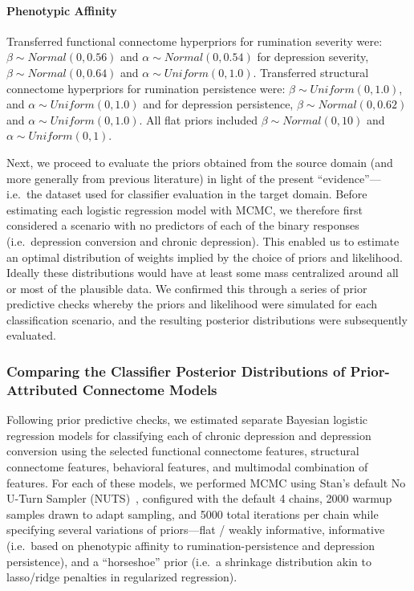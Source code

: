 \documentclass[
  notitlepage]{article}
\begin{document}
\hypertarget{phenotypic-affinity}{%
\paragraph{Phenotypic Affinity}\label{phenotypic-affinity}}
Transferred functional connectome hyperpriors for rumination severity
were: \(\beta \sim Normal(0, 0.56)\) and \(\alpha \sim Normal(0, 0.54)\)
for depression severity, \(\beta \sim Normal(0, 0.64)\) and
\(\alpha \sim Uniform(0, 1.0)\). Transferred structural connectome
hyperpriors for rumination persistence were:
\(\beta \sim Uniform(0, 1.0)\), and \(\alpha \sim Uniform(0, 1.0)\) and
for depression persistence, \(\beta \sim Normal(0, 0.62)\) and
\(\alpha \sim Uniform(0, 1.0)\). All flat priors included
\(\beta \sim Normal(0, 10)\) and \(\alpha \sim Uniform(0, 1)\).

Next, we proceed to evaluate the priors obtained from the source domain
(and more generally from previous literature) in light of the present
``evidence''---i.e.~the dataset used for classifier evaluation in the
target domain. Before estimating each logistic regression model with
MCMC, we therefore first considered a scenario with no predictors of
each of the binary responses (i.e.~depression conversion and chronic
depression). This enabled us to estimate an optimal distribution of
weights implied by the choice of priors and likelihood. Ideally these
distributions would have at least some mass centralized around all or
most of the plausible data. We confirmed this through a series of prior
predictive checks whereby the priors and likelihood were simulated for
each classification scenario, and the resulting posterior distributions
were subsequently evaluated.

\hypertarget{comparing-the-classifier-posterior-distributions-of-prior-attributed-connectome-models}{%
\subsubsection{Comparing the Classifier Posterior Distributions of
Prior-Attributed Connectome
Models}\label{comparing-the-classifier-posterior-distributions-of-prior-attributed-connectome-models}}
Following prior predictive checks, we estimated separate Bayesian
logistic regression models for classifying each of chronic depression
and depression conversion using the selected functional connectome
features, structural connectome features, behavioral features, and
multimodal combination of features. For each of these models, we
performed MCMC using Stan's default No U-Turn Sampler
(NUTS)~\cite{STAN}, configured with the default 4
chains, 2000 warmup samples drawn to adapt sampling, and 5000 total
iterations per chain while specifying several variations of
priors---flat / weakly informative, informative (i.e.~based on
phenotypic affinity to rumination-persistence and depression
persistence), and a ``horseshoe'' prior (i.e.~a shrinkage distribution
akin to lasso/ridge penalties in regularized regression).
\end{document}
